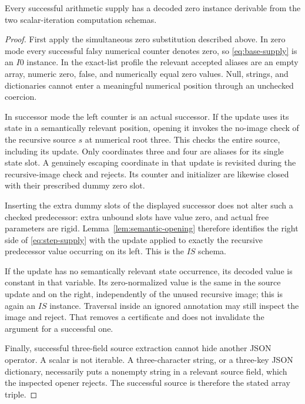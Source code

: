 \begin{lemma}
\label{lem:constructed-supply}
Every successful arithmetic supply has a decoded zero instance
derivable from the two scalar-iteration computation schemas.
\end{lemma}

\begin{proof}
First apply the simultaneous zero substitution described above.  In
zero mode every successful falsy numerical counter denotes zero, so
\eqref{eq:base-supply} is an $I0$ instance.  In the exact-list profile
the relevant accepted aliases are an empty array, numeric zero, false,
and numerically equal zero values.  Null, strings, and dictionaries
cannot enter a meaningful numerical position through an unchecked
coercion.

In successor mode the left counter is an actual successor.  If the
update uses its state in a semantically relevant position, opening it
invokes the no-image check of the recursive source $s$ at numerical
root three.  This checks the entire source, including its update.
Only coordinates three and four are aliases for its single state slot.
A genuinely escaping coordinate in that update is revisited during
the recursive-image check and rejects.  Its counter and initializer
are likewise closed with their prescribed dummy zero slot.

Inserting the extra dummy slots of the displayed successor does not
alter such a checked predecessor: extra unbound slots have value zero,
and actual free parameters are rigid.  Lemma~\ref{lem:semantic-opening}
therefore identifies the right side of \eqref{eq:step-supply} with the
update applied to exactly the recursive predecessor value occurring
on its left.  This is the $IS$ schema.

If the update has no semantically relevant state occurrence, its
decoded value is constant in that variable.  Its zero-normalized value
is the same in the source update and on the right, independently of
the unused recursive image; this is again an $IS$ instance.  Traversal
inside an ignored annotation may still inspect the image and reject.
That removes a certificate and does not invalidate the argument for a
successful one.

Finally, successful three-field source extraction cannot hide another
JSON operator.  A scalar is not iterable.  A three-character string,
or a three-key JSON dictionary, necessarily puts a nonempty string in
a relevant source field, which the inspected opener rejects.  The
successful source is therefore the stated array triple.
\end{proof}

